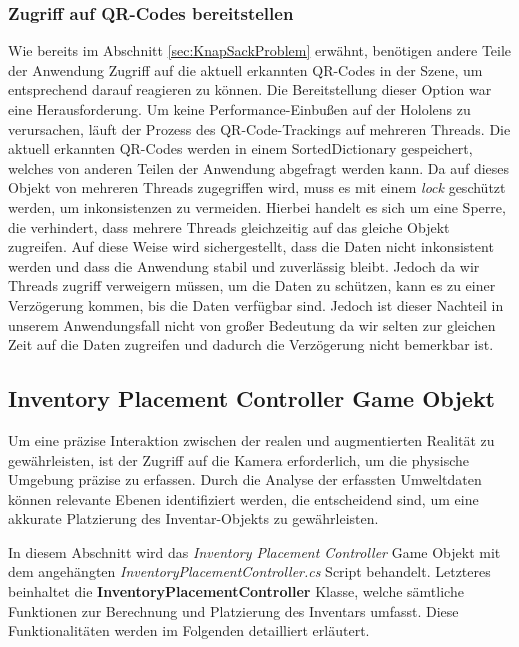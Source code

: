 \subsubsection{Zugriff auf QR-Codes bereitstellen}
Wie bereits im Abschnitt \ref{sec:KnapSackProblem} erwähnt, benötigen andere Teile der Anwendung Zugriff auf
die aktuell erkannten QR-Codes in der Szene, um entsprechend darauf reagieren zu können. Die Bereitstellung dieser Option war eine Herausforderung.
Um keine Performance-Einbußen auf der Hololens zu verursachen, läuft der Prozess des QR-Code-Trackings auf
mehreren Threads. Die aktuell erkannten QR-Codes werden in einem SortedDictionary gespeichert, welches von anderen Teilen
der Anwendung abgefragt werden kann. Da auf dieses Objekt von mehreren Threads zugegriffen wird, muss es mit einem
\textit{lock} geschützt werden, um inkonsistenzen zu vermeiden. Hierbei handelt es sich um eine Sperre, die verhindert,
dass mehrere Threads gleichzeitig auf das gleiche Objekt zugreifen. Auf diese Weise wird sichergestellt, dass die Daten
nicht inkonsistent werden und dass die Anwendung stabil und zuverlässig bleibt. Jedoch da wir Threads zugriff verweigern
müssen, um die Daten zu schützen, kann es zu einer Verzögerung kommen, bis die Daten verfügbar sind. Jedoch ist dieser
Nachteil in unserem Anwendungsfall nicht von großer Bedeutung da wir selten zur gleichen Zeit auf die Daten zugreifen und
dadurch die Verzögerung nicht bemerkbar ist.

\subsection{Inventory Placement Controller Game Objekt}
Um eine präzise Interaktion zwischen der realen und augmentierten Realität zu gewährleisten, ist der Zugriff auf die
Kamera erforderlich, um die physische Umgebung präzise zu erfassen. Durch die Analyse der erfassten Umweltdaten können
relevante Ebenen identifiziert werden, die entscheidend sind, um eine akkurate Platzierung des Inventar-Objekts zu gewährleisten.

In diesem Abschnitt wird das \textit{Inventory Placement Controller} Game Objekt mit dem angehängten
\textit{InventoryPlacementController.cs} Script behandelt. Letzteres beinhaltet die \textbf{InventoryPlacementController}
Klasse, welche sämtliche Funktionen zur Berechnung und Platzierung des Inventars umfasst. Diese Funktionalitäten werden
im Folgenden detailliert erläutert.

